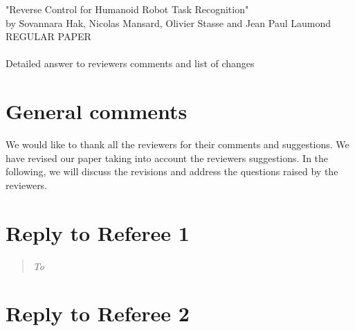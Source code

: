 \documentclass[11pt]{article}
\begin{document}
\begin{center}
  {\large "Reverse Control for Humanoid Robot Task Recognition" \\
  \small by Sovannara Hak, Nicolas Mansard, Olivier Stasse and Jean Paul Laumond\\
  \small REGULAR PAPER \\
  ~ \\
  \large Detailed answer to reviewers comments and list of changes\\}
\end{center}


\section{General comments}
We would like to thank all the reviewers for their comments and suggestions.
We have revised	our paper taking into account the reviewers suggestions.
In the following, we will discuss the revisions and address the questions raised by the reviewers.

\section{Reply to Referee 1}
\begin{quote}
  \textit{To}
\end{quote}

\section{Reply to Referee 2}
\end{document}
